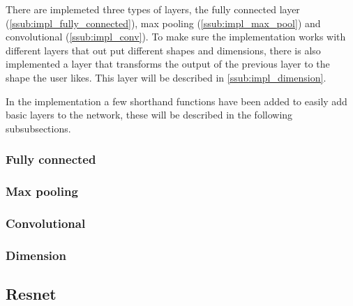 There are implemeted three types of layers, the fully connected layer (\autoref{ssub:impl_fully_connected}), max pooling (\autoref{ssub:impl_max_pool}) and convolutional (\autoref{ssub:impl_conv}).
To make sure the implementation works with different layers that out put different shapes and dimensions, there is also implemented a layer that transforms the output of the previous layer to the shape the user likes. This layer will be described in \autoref{ssub:impl_dimension}.

In the implementation a few shorthand functions have been added to easily add basic layers to the network, these will be described in the following subsubsections.

\subsubsection{Fully connected}%
\label{ssub:impl_fully_connected}



\subsubsection{Max pooling}
\label{ssub:impl_max_pool}

\subsubsection{Convolutional}
\label{ssub:impl_conv}

\subsubsection{Dimension}%
\label{ssub:impl_dimension}


\subsection{Resnet}
